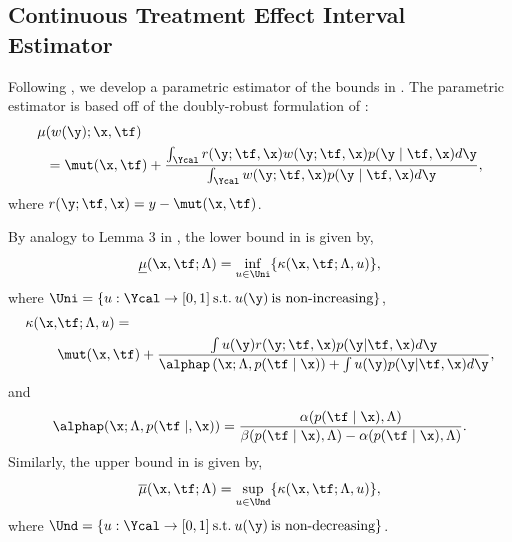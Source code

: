 \subsection{Continuous Treatment Effect Interval Estimator}
\label{sec:estimator}
Following \cite{jesson2021quantifying}, we develop a parametric estimator of the bounds in . 
The parametric estimator is based off of the doubly-robust formulation of :
\begin{equation}
    \begin{split}
        \mu&(w(\y); \x, \tf) \\
        &= \mut(\x, \tf) + \frac{\int_\Ycal r(\y; \tf, \x) w(\y; \tf, \x)p(\y \mid \tf, \x)d\y}{\int_\Ycal w(\y; \tf, \x)p(\y \mid \tf, \x)d\y},
    \end{split}
\end{equation}
where $r(\y; \tf, \x) = y - \mut(\x, \tf)$.

By analogy to Lemma 3 in \cite{jesson2021quantifying}, the lower bound in  is given by,
\begin{equation}
    \underline{\mu}(\x, \tf; \Lambda) = \inf_{u \in \Uni} \{ \kappa(\x, \tf; \Lambda, u) \},
\end{equation}
where $\Uni = \{ u: \Ycal \to [0, 1] \: \textrm{s.t}.\: u(\y) \: \textrm{is non-increasing} \}$,
\begin{equation*}
    \begin{split}
        \kappa(\x, &\tf; \Lambda, u) = \\
        &\mut(\x, \tf) + \frac{\int u(\y) r(\y; \tf, \x) p(\y | \tf, \x)d\y}{\alphap\left(\x; \Lambda, p(\tf \mid \x)\right) + \int u(\y)p(\y | \tf, \x)d\y},
    \end{split}
    \label{eq:kappa}
\end{equation*}
and 
\begin{equation*}
    \alphap(\x; \Lambda, p(\tf \mid, \x)) = \frac{\alpha(p(\tf \mid \x), \Lambda)}{\beta(p(\tf \mid \x), \Lambda) - \alpha(p(\tf \mid \x), \Lambda)}.
    \label{eq:gamma}
\end{equation*}
Similarly, the upper bound in  is given by,
\begin{equation}
        \overline{\mu}(\x, \tf; \Lambda) = \sup_{u \in \Und} \{ \kappa(\x, \tf; \Lambda, u) \},
\end{equation}
where $\Und = \{ u: \Ycal \to [0, 1] \: \textrm{s.t}.\: u(\y) \: \textrm{is non-decreasing} \}$.


